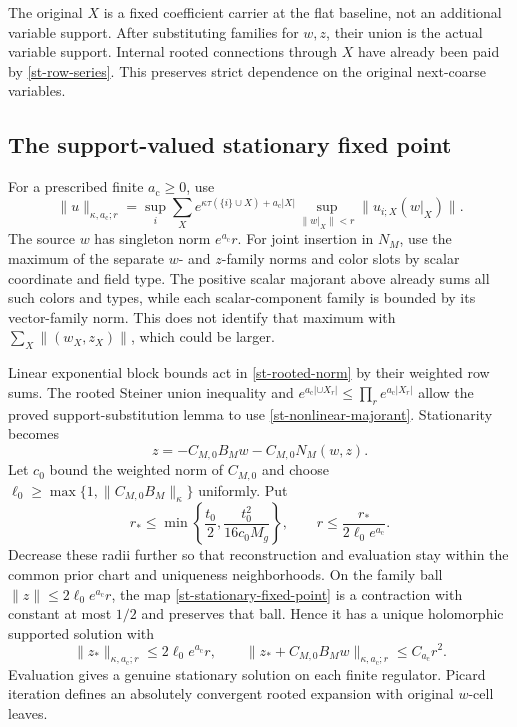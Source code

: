 The original $X$ is a fixed coefficient carrier at the flat baseline,
not an additional variable support. After substituting families for
$w,z$, their union is the actual variable support. Internal rooted
connections through $X$ have already been paid by
\eqref{st-row-series}. This preserves strict dependence on the original
next-coarse variables.

\subsection{The support-valued stationary fixed point}
\label{st-contraction-section}

For a prescribed finite $a_{\mathrm c}\ge0$, use
\begin{equation}
 \|u\|_{\kappa,a_{\mathrm c};r}
 =\sup_i\sum_X e^{\kappa\tau(\{i\}\cup X)+a_{\mathrm c}|X|}
             \sup_{\|w|_X\|<r}\|u_{i;X}(w|_X)\|.            \label{st-rooted-norm}
\end{equation}
The source $w$ has singleton norm $e^{a_{\mathrm c}}r$. For joint insertion
in $N_M$, use the maximum of the separate $w$- and $z$-family norms and
color slots by scalar coordinate and field type. The positive scalar
majorant above already sums all such colors and types, while each
scalar-component family is bounded by its vector-family norm. This
does not identify that maximum with
$\sum_X\|(w_X,z_X)\|$, which could be larger.

Linear exponential block bounds act in \eqref{st-rooted-norm} by their
weighted row sums. The rooted Steiner union inequality and
$e^{a_{\mathrm c}|\cup X_r|}\le\prod_r e^{a_{\mathrm c}|X_r|}$ allow the
proved support-substitution lemma to use
\eqref{st-nonlinear-majorant}. Stationarity becomes
\begin{equation}
 z=-C_{M,0}B_Mw-C_{M,0}N_M(w,z).                            \label{st-stationary-fixed-point}
\end{equation}
Let $c_0$ bound the weighted norm of $C_{M,0}$ and choose
$\ell_0\ge\max\{1,\|C_{M,0}B_M\|_\kappa\}$ uniformly. Put
\begin{equation}
 r_*\le\min\left\{\frac{t_0}{2},
                  \frac{t_0^2}{16c_0M_g}\right\},\qquad
 r\le\frac{r_*}{2\ell_0e^{a_{\mathrm c}}}.                     \label{st-data-radius}
\end{equation}
Decrease these radii further so that reconstruction and evaluation stay
within the common prior chart and uniqueness neighborhoods. On the
family ball $\|z\|\le2\ell_0e^{a_{\mathrm c}}r$, the map
\eqref{st-stationary-fixed-point} is a contraction with constant at most
$1/2$ and preserves that ball. Hence it has a unique holomorphic
supported solution with
\begin{equation}
 \|z_*\|_{\kappa,a_{\mathrm c};r}\le2\ell_0e^{a_{\mathrm c}}r,
 \qquad
 \|z_*+C_{M,0}B_Mw\|_{\kappa,a_{\mathrm c};r}\le C_{a_{\mathrm c}}r^2.
                                                               \label{st-retained-support}
\end{equation}
Evaluation gives a genuine stationary solution on each finite
regulator. Picard iteration defines an absolutely convergent rooted
expansion with original $w$-cell leaves.

